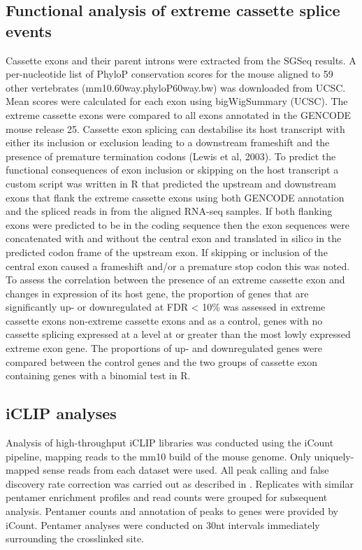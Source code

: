 \subsection{Functional analysis of extreme cassette splice events}
Cassette exons and their parent introns were extracted from the SGSeq results.
A per-nucleotide list of  PhyloP  conservation  scores \citep{Pollard2010-fj} for  the mouse  aligned  to  59  other  vertebrates (mm10.60way.phyloP60way.bw) was downloaded from UCSC. Mean scores were calculated for each exon  using  bigWigSummary  (UCSC). The  extreme  cassette  exons  were  compared  to  all  exons annotated in the GENCODE mouse release 25. Cassette exon splicing can destabilise its host transcript with either its inclusion or exclusion leading to a downstream frameshift and the presence of premature termination codons (Lewis et al, 2003). 
To predict the functional consequences of exon inclusion or skipping on the host transcript a custom script was written in R that predicted the upstream and downstream exons that  flank the extreme cassette exons using both GENCODE annotation and the spliced reads in from the aligned RNA-seq samples. If both flanking exons were predicted to be in the coding sequence then the exon sequences were concatenated with and without the central exon and translated in silico in the predicted codon frame of the upstream exon. If skipping or inclusion of the central exon caused a frameshift and/or a premature stop codon this was noted. 
To  assess  the  correlation  between  the  presence  of  an  extreme  cassette  exon  and  changes  in expression of its host gene, the proportion of genes that are significantly up- or downregulated at FDR < 10\% was assessed in extreme cassette exons non-extreme cassette exons and as a control, genes with no cassette splicing expressed at a level at or greater than the most lowly expressed extreme exon gene. The proportions of up- and downregulated genes were compared between  the control genes and the two groups of cassette exon containing genes with a binomial test in R.   

\subsection{iCLIP analyses}
Analysis  of  high-throughput  iCLIP  libraries  was  conducted  using  the  iCount  pipeline,  mapping  reads  to  the mm10 build of the mouse genome.
Only  uniquely-mapped  sense  reads  from each dataset were used. All peak calling and false discovery rate correction was carried out as described in \citep{Huppertz2014-ip,Konig2010}. Replicates with similar pentamer enrichment profiles and read  counts were  grouped  for  subsequent analysis. Pentamer  counts and annotation  of  peaks  to genes were provided by iCount. Pentamer analyses were conducted on 30nt intervals immediately surrounding the crosslinked site. 

